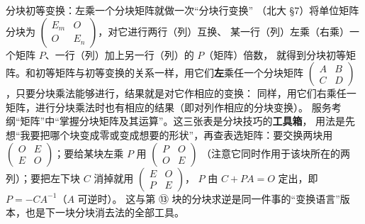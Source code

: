 \begin{fdeep}{分块初等变换：左乘一个分块矩阵就做一次“分块行变换”}
（北大 §7）将单位矩阵分块为 $\begin{pmatrix}E_m&O\\O&E_n\end{pmatrix}$，对它进行两行（列）互换、
某一行（列）左乘（右乘）一个矩阵 $P$、一行（列）加上另一行（列）的 $P$（矩阵）倍数，
就得到分块初等矩阵。和初等矩阵与初等变换的关系一样，用它们\textbf{左}乘任一个分块矩阵
$\begin{pmatrix}A&B\\C&D\end{pmatrix}$，只要分块乘法能够进行，结果就是对它作相应的变换：
同样，用它们右乘任一矩阵，进行分块乘法时也有相应的结果（即对列作相应的分块变换）。
\fbref{}服务考纲“矩阵”中“掌握分块矩阵及其运算”。这三张表是分块技巧的\textbf{工具箱}，
用法是先想“我要把哪个块变成零或变成想要的形状”，再查表选矩阵：要交换两块用
$\begin{pmatrix}O&E\\E&O\end{pmatrix}$；要给某块左乘 $P$ 用 $\begin{pmatrix}P&O\\O&E\end{pmatrix}$
（注意它同时作用于该块所在的两列）；要把左下块 $C$ 消掉就用 $\begin{pmatrix}E&O\\P&E\end{pmatrix}$，
$P$ 由 $C+PA=O$ 定出，即 $P=-CA^{-1}$（$A$ 可逆时）。
这与第 ⑬ 块的分块求逆是同一件事的“变换语言”版本，也是下一块分块消去法的全部工具。
\end{fdeep}

